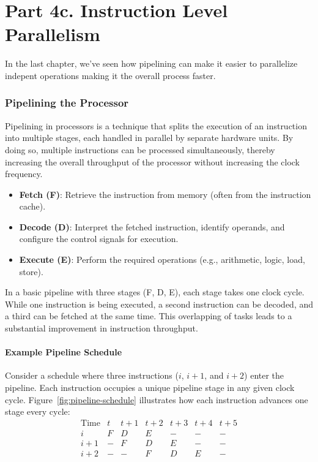\chapter{Part 4c. Instruction Level Parallelism}
In the last chapter, we've seen how pipelining can make it easier to parallelize indepent operations making it the overall process faster.

\subsection{Pipelining the Processor}
Pipelining in processors is a technique that splits the execution of an instruction into multiple stages, each handled in parallel by separate hardware units. By doing so, multiple instructions can be processed simultaneously, thereby increasing the overall throughput of the processor without increasing the clock frequency.

\begin{itemize}
    \item \textbf{Fetch (F)}: Retrieve the instruction from memory (often from the instruction cache).
    \item \textbf{Decode (D)}: Interpret the fetched instruction, identify operands, and configure the control signals for execution.
    \item \textbf{Execute (E)}: Perform the required operations (e.g., arithmetic, logic, load, store).
\end{itemize}

\noindent In a basic pipeline with three stages (F, D, E), each stage takes one clock cycle. While one instruction is being executed, a second instruction can be decoded, and a third can be fetched at the same time. This overlapping of tasks leads to a substantial improvement in instruction throughput.


\subsubsection*{Example Pipeline Schedule}
Consider a schedule where three instructions (\(i\), \(i+1\), and \(i+2\)) enter the pipeline. Each instruction occupies a unique pipeline stage in any given clock cycle. Figure~\ref{fig:pipeline-schedule} illustrates how each instruction advances one stage every cycle:
\[
\begin{array}{c|cccccc}
\text{Time} & t & t+1 & t+2 & t+3 & t+4 & t+5 \\ \hline
i     & F & D & E & - & - & - \\
i+1   & - & F & D & E & - & - \\
i+2   & - & - & F & D & E & - \\
\end{array}
\]

